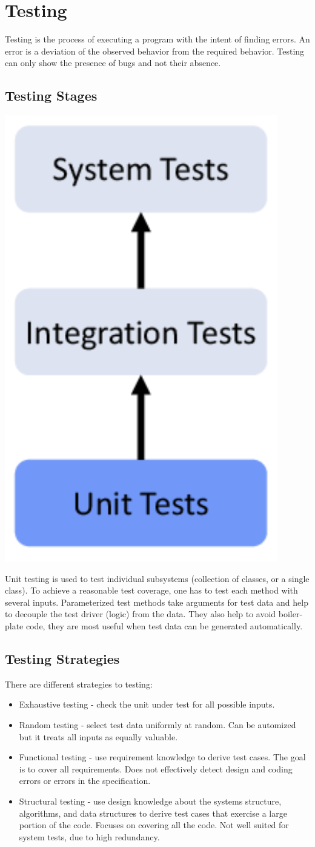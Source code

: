 \section{Testing}

Testing is the process of executing a program with the intent of finding errors. An error is a deviation of the observed behavior from the required behavior. Testing can only show the presence of bugs and not their absence.


\subsection{Testing Stages}
\begin{center}
	\includegraphics[width=0.3\columnwidth]{assets/testing_stages}
\end{center}

Unit testing is used to test individual subsystems (collection of classes, or a single class). To achieve a reasonable test coverage, one has to test each method with several inputs. Parameterized test methods take arguments for test data and help to decouple the test driver (logic) from the data. They also help to avoid boiler-plate code, they are most useful when test data can be generated automatically.


\subsection{Testing Strategies}

There are different strategies to testing:
\begin{itemize}
	\item Exhaustive testing - check the unit under test for all possible inputs.
	\item Random testing - select test data uniformly at random. Can be automized but it treats all inputs as equally valuable.
	\item Functional testing - use requirement knowledge to derive test cases. The goal is to cover all requirements. Does not effectively detect design and coding errors or errors in the specification.
	\item Structural testing - use design knowledge about the systems structure, algorithms, and data structures to derive test cases that exercise a large portion of the code. Focuses on covering all the code. Not well suited for system tests, due to high redundancy.
\end{itemize}

